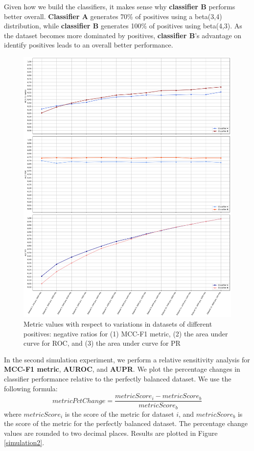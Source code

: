 \documentclass[12pt, oneside]{amsart}
\theoremstyle{definition}
\theoremstyle{remark}
\numberwithin{equation}{section}
\begin{document}
Given how we build the classifiers, it makes sense why \textbf{classifier B} performs better overall. \textbf{Classifier A} generates 70\% of positives using a beta(3,4) distribution, while \textbf{classifier B} generates 100\% of positives using beta(4,3). As the dataset becomes more dominated by positives, \textbf{classifier B}'s advantage on identify positives leads to an overall better performance.\\

\begin{figure}
    \centering
    \includegraphics[scale=0.28]{Report/Figure/simulation1.jpg}
    \caption{Metric values with respect to variations in datasets of different positives: negative ratios for (1) MCC-F1 metric, (2) the area under curve for ROC, and (3) the area under curve for PR}
    \label{simulation1}
\end{figure}


In the second simulation experiment, we perform a relative sensitivity analysis for \textbf{MCC-F1 metric}, \textbf{AUROC}, and \textbf{AUPR}. We plot the percentage changes in classifier performance relative to the perfectly balanced dataset. We use the following formula: $$metricPctChange = \frac{metricScore_i - metricScore_b}{metricScore_b}$$ where $metricScore_i$ is the score of the metric for dataset $i$, and $metricScore_b$ is the score of the metric for the perfectly balanced dataset. The percentage change values are rounded to two decimal places. Results are plotted in Figure \ref{simulation2}. \\
\end{document}
